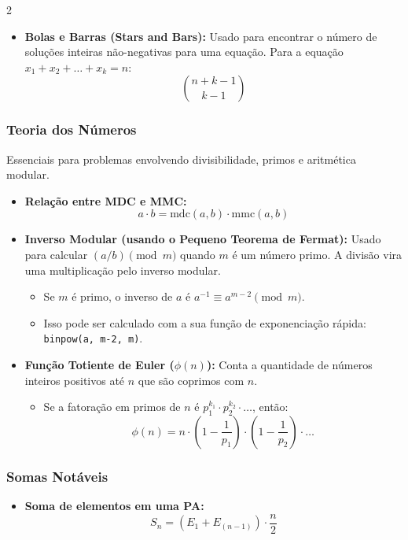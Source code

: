 \documentclass[11pt]{article}
\begin{document}
\begin{multicols}{2}
\begin{itemize}
    \item \textbf{Bolas e Barras (Stars and Bars):} Usado para encontrar o número de soluções inteiras não-negativas para uma equação. Para a equação $x_1 + x_2 + \dots + x_k = n$:
    \[ \binom{n+k-1}{k-1} \]
\end{itemize}

\subsubsection{Teoria dos Números}

Essenciais para problemas envolvendo divisibilidade, primos e aritmética modular.

\begin{itemize}
    \item \textbf{Relação entre MDC e MMC:}
    \[ a \cdot b = \text{mdc}(a, b) \cdot \text{mmc}(a, b) \]
    
    \item \textbf{Inverso Modular (usando o Pequeno Teorema de Fermat):} Usado para calcular $(a / b) \pmod{m}$ quando $m$ é um número primo. A divisão vira uma multiplicação pelo inverso modular.
    \begin{itemize}
        \item Se $m$ é primo, o inverso de $a$ é $a^{-1} \equiv a^{m-2} \pmod{m}$.
        \item Isso pode ser calculado com a sua função de exponenciação rápida: \texttt{binpow(a, m-2, m)}.
    \end{itemize}
    
    \item \textbf{Função Totiente de Euler ($\phi(n)$):} Conta a quantidade de números inteiros positivos até $n$ que são coprimos com $n$.
    \begin{itemize}
        \item Se a fatoração em primos de $n$ é $p_1^{k_1} \cdot p_2^{k_2} \cdot \dots$, então:
        \[ \phi(n) = n \cdot \left(1 - \frac{1}{p_1}\right) \cdot \left(1 - \frac{1}{p_2}\right) \cdot \dots \]
    \end{itemize}
\end{itemize}

\subsubsection{Somas Notáveis}

\begin{itemize}
    \item \textbf{Soma de elementos em uma PA:}
    \[ S_n = (E_1 + E_{(n-1)}) \cdot \frac{n}{2} \]
    

\end{itemize}
\end{multicols}
\end{document}
